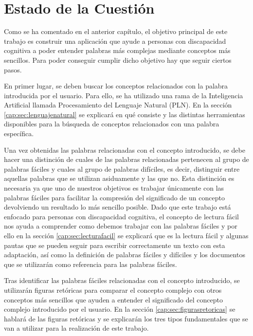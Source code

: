 \chapter{Estado de la Cuestión}
\label{cap:estadoDeLaCuestion}

Como se ha comentado en el anterior capítulo, el objetivo principal de este trabajo es construir una aplicación que ayude a personas con discapacidad cognitiva a poder entender palabras más complejas mediante conceptos más sencillos. Para poder conseguir cumplir dicho objetivo hay que seguir ciertos pasos.

En primer lugar, se deben buscar los conceptos relacionados con la palabra introducida por el usuario. Para ello, se ha utilizado una rama de la Inteligencia Artificial llamada Procesamiento del Lenguaje Natural (PLN). En la sección \ref{cap:sec:lenguajenatural} se explicará en qué consiste y las distintas herramientas disponibles para la búsqueda de conceptos relacionados con una palabra específica.

Una vez obtenidas las palabras relacionadas con el concepto introducido, se debe hacer una distinción de cuales de las palabras relacionadas pertenecen al grupo de palabras fáciles y cuales al grupo de palabras difíciles, es decir, distinguir entre aquellas palabras que se utilizan asiduamente y las que no.
Esta distinción es necesaria ya que uno de nuestros objetivos es trabajar únicamente con las palabras fáciles para facilitar la compresión del significado de un concepto devolviendo un resultado lo más sencillo posible. Dado que este trabajo está enfocado para personas con discapacidad cognitiva, el concepto de lectura fácil nos ayuda a comprender como debemos trabajar con las palabras fáciles y por ello en la sección \ref{cap:sec:lecturafacil} se explicará que es la lectura fácil y algunas pautas que se pueden seguir para escribir correctamente un texto con esta adaptación, así como la definición de palabras fáciles y difíciles y los documentos que se utilizarán como referencia para las palabras fáciles.

Tras identificar las palabras fáciles relacionadas con el concepto introducido, se utilizarán figuras retóricas para comparar el concepto complejo con otros conceptos más sencillos que ayuden a entender el significado del concepto complejo introducido por el usuario. En la sección \ref{cap:sec:figurasretoricas} se hablará de las figuras retóricas y se explicarán los tres tipos fundamentales que se van a utilizar para la realización de este trabajo. 

